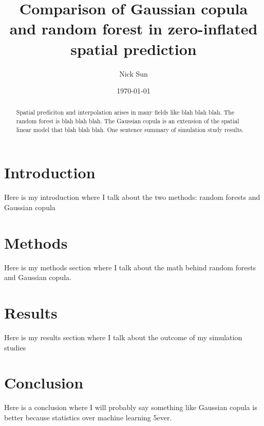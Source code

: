 \documentclass{article}
\title{Comparison of Gaussian copula and random forest in zero-inflated spatial prediction}
\date{\today}
\author{Nick Sun}
\begin{document}
\maketitle

\begin{abstract}
	Spatial prediciton and interpolation arises in many fields like blah blah blah.
	The random forest is blah blah blah.
	The Gaussian copula is an extension of the spatial linear model that blah blah blah.
	One sentence summary of simulation study results.
\end{abstract}

\section{Introduction}
Here is my introduction where I talk about the two methods: random forests\cite{rfsp} and Gaussian copula \cite{madsen09}


\section{Methods}
Here is my methods section where I talk about the math behind random forests and Gaussian copula\cite{verhoef02}.

\section{Results}
Here is my results section where I talk about the outcome of my simulation studies

\section{Conclusion}
Here is a conclusion where I will probably say something like Gaussian copula is better because statistics over machine learning 5ever.

\printbibliography
\end{document}
